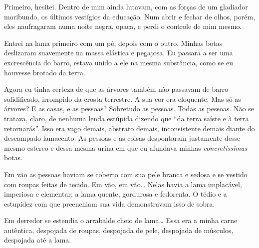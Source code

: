 Primeiro, hesitei. Dentro de mim ainda lutavam, com as forças de um gladiador
moribundo, os últimos vestígios da educação. Num abrir e fechar de olhos,
porém, eles naufragaram numa noite negra, opaca, e perdi o controle de mim
mesmo.

Entrei na lama primeiro com um pé, depois com o outro. Minhas botas deslizaram
suavemente na massa elástica e pegajosa. Eu passara a ser uma excrescência do
barro, estava unido a ele na mesma substância, como se eu houvesse brotado da
terra.

Agora eu tinha certeza de que as árvores também não passavam de barro
solidificado, irrompido da crosta terrestre. A sua cor era eloquente. Mas só
as árvores? E as casas, e as pessoas? Sobretudo as pessoas. Todas as pessoas.
Não se tratava, claro, de nenhuma lenda estúpida dizendo que ``da terra
saíste e à terra retornarás''. Isso era vago demais, abstrato demais,
inconsistente demais diante do descampado lamacento. As pessoas e as coisas
despontaram justamente desse mesmo esterco e dessa mesma urina em que eu
afundava minhas \textit{concretíssimas} botas.

Em vão as pessoas haviam se coberto com sua pele branca e sedosa e se vestido
com roupas feitas de tecido. Em vão, em vão\ldots{} Nelas havia a lama
implacável, imperiosa e elementar; a lama quente, gordurosa e fedorenta. O
tédio e a estupidez com que preenchiam sua vida demonstravam isso de sobra.


Em derredor se estendia o arrabalde cheio de lama\ldots{} Essa era a minha
carne autêntica, despojada de roupas, despojada de pele, despojada de
músculos, despojada até a lama.


